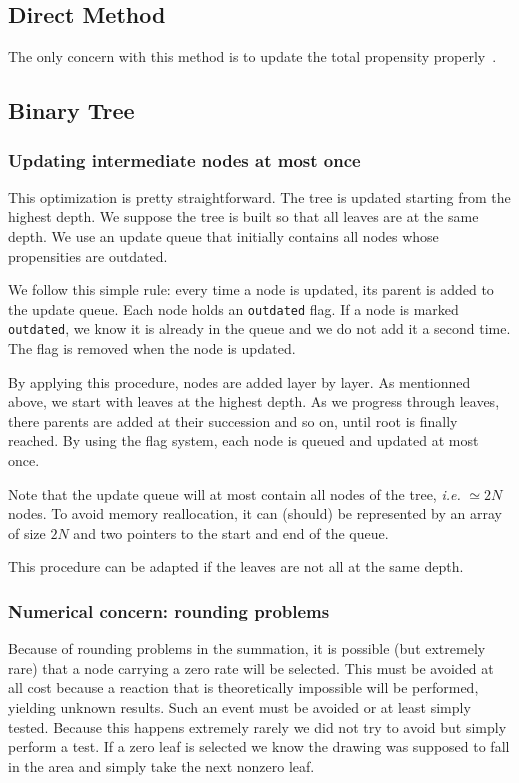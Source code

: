 \subsection{Direct Method}
The only concern with this method is to update the total propensity properly~.

\subsection{Binary Tree}

\subsubsection{Updating intermediate nodes at most once}
This optimization is pretty straightforward. The tree is updated starting from the highest depth. We suppose the tree is built so that all leaves are at the same depth. We use an update queue that initially contains all nodes whose propensities are outdated. 

We follow this simple rule: every time a node is updated, its parent is added to the update queue. Each node holds an \texttt{outdated} flag. If a node is marked \texttt{outdated}, we know it is already in the queue and we do not add it a second time. The flag is removed when the node is updated. 

By applying this procedure, nodes are added layer by layer. As mentionned above, we start with leaves at the highest depth. As we progress through leaves, there parents are added at their succession and so on, until root is finally reached. By using the flag system, each node is queued and updated at most once.

Note that the update queue will at most contain all nodes of the tree, \textit{i.e.} $\simeq 2N$ nodes. To avoid memory reallocation, it can (should) be represented by an array of size $2N$ and two pointers to the start and end of the queue. 

This procedure can be adapted if the leaves are not all at the same depth.

\subsubsection{Numerical concern: rounding problems}

Because of rounding problems in the summation, it is possible (but extremely rare) that a node carrying a zero rate will be selected. This must be avoided at all cost because a reaction that is theoretically impossible will be performed, yielding unknown results. Such an event must be avoided or at least simply tested. Because this happens extremely rarely we did not try to avoid but simply perform a test. If a zero leaf is selected we know the drawing was supposed to fall in the area and simply take the next nonzero leaf.

